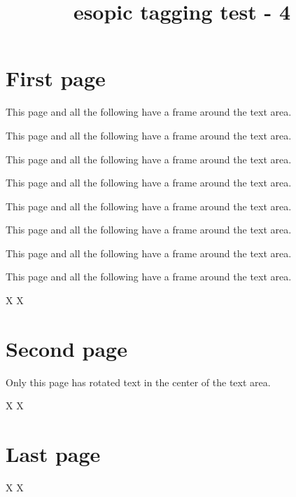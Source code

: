 \documentclass[a4paper,twoside]{article}
\title{esopic tagging test - 4}
\begin{document}
  \section*{First page}


  This page and all the following have a frame around the
  text area. \par
  This page and all the following have a frame around the
  text area. \par
  This page and all the following have a frame around the
  text area. \par
  This page and all the following have a frame around the
  text area. \par
  This page and all the following have a frame around the
  text area. \par
  This page and all the following have a frame around the
  text area. \par
  This page and all the following have a frame around the
  text area. \par
  This page and all the following have a frame around the
  text area. \par

  \vfill
  X \hfill X\newpage

  \section*{Second page}


  Only this page has rotated text in the center of the text area.

  \vfill
  X \hfill X\newpage

  \section*{Last page}

  \vfill
  X \hfill X
\end{document}
